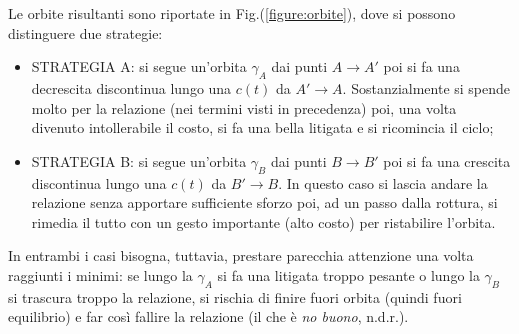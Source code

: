 \documentclass[12pt, a4paper]{book}
\theoremstyle{theorem}
\begin{document}
				Le orbite risultanti sono riportate in Fig.(\ref{figure:orbite}), dove si possono distinguere due strategie:
				\begin{itemize}
					\item STRATEGIA A: si segue un'orbita $\gamma_{A}$ dai punti $A\rightarrow A'$ poi si fa una decrescita discontinua lungo una $c(t)$ da $A'\rightarrow A$.
						Sostanzialmente si spende molto per la relazione (nei termini visti in precedenza) poi, una volta divenuto intollerabile il costo, si fa una bella litigata e si ricomincia il ciclo;
					\item STRATEGIA B: si segue un'orbita $\gamma_{B}$ dai punti $B\rightarrow B'$ poi si fa una crescita discontinua lungo una $c(t)$ da $B'\rightarrow B$.
						In questo caso si lascia andare la relazione senza apportare sufficiente sforzo poi, ad un passo dalla rottura, si rimedia il tutto con un gesto importante (alto costo) per ristabilire l'orbita.
				\end{itemize}
				In entrambi i casi bisogna, tuttavia, prestare parecchia attenzione una volta raggiunti i minimi: se lungo la $\gamma_{A}$ si fa una litigata troppo pesante o lungo la $\gamma_{B}$ si trascura troppo la relazione, si rischia di finire fuori orbita (quindi fuori equilibrio) e far così fallire la relazione (il che è \emph{no buono}, n.d.r.).
\end{document}
